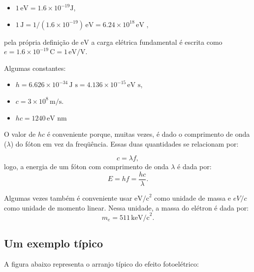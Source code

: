 \documentclass{article}
\begin{document}
\begin{itemize}
\item $1\,\text{eV} = 1.6\times 10^{-19}\text{J}$,
\item $1\,\text{J} = 1/(1.6\times 10^{-19})\,\text{eV} = 6.24\times 10^{18}\,\text{eV}$ ,
\end{itemize}
pela pr\'opria defini\c c\~ao de $\text{eV}$ a carga el\'etrica fundamental \'e escrita como $e = 1.6\times 10^{-19}\,\text{C} = 1\,\text{eV/V}$.

Algumas constantes:

\begin{itemize}
\item $h = 6.626\times 10^{-34}\,\text{J s} = 4.136\times 10^{-15}\,\text{eV s}$,
\item $c = 3\times 10^{8}\,\text{m/s}$.
\item $hc = 1240\,\text{eV nm}$
\end{itemize}
O valor de $hc$ \'e conveniente porque, muitas vezes, \'e dado o comprimento de onda ($\lambda$) do f\'oton em vez da freq\"u\^encia. Essas duas quantidades se relacionam por:

\begin{equation}
c = \lambda f,
\end{equation}
logo, a energia de um f\'oton com comprimento de onda $\lambda$ \'e dada por:
\begin{equation}
E = hf = \frac{hc}{\lambda}.
\end{equation}

Algumas vezes tamb\'em \'e conveniente usar $\text{eV/c}^2$ como unidade de massa e $eV/c$ como unidade de momento linear. Nessa unidade, a massa do el\'etron é dada por:
\begin{equation}
m_e = 511\, \text{keV/c}^2.
\end{equation}

\subsection{Um exemplo t\'ipico}

A figura abaixo representa o arranjo t\'ipico do efeito fotoel\'etrico:
\end{document}

